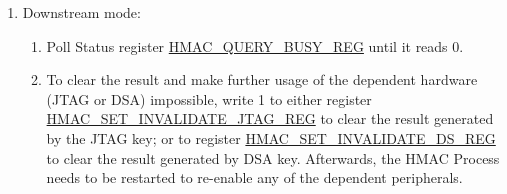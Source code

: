 \documentclass[main\_\_EN.tex]{subfiles}
\begin{document}
\begin{enumerate}
    \item Downstream mode:
    \begin{enumerate}
        \item Poll Status register \hyperref[regdesc:HMACQUERYBUSYREG]{HMAC\_QUERY\_BUSY\_REG} until it reads 0.
        \item
        To clear the result and make further usage of the dependent hardware (JTAG or DSA) impossible, write 1 to either register \hyperref[regdesc:HMACSETINVALIDATEJTAGREG]{HMAC\_SET\_INVALIDATE\_JTAG\_REG} to clear the result generated by the JTAG key; or to register \hyperref[regdesc:HMACSETINVALIDATEDSREG]{HMAC\_SET\_INVALIDATE\_DS\_REG} to clear the result generated by DSA key. Afterwards, the HMAC Process needs to be restarted to re-enable any of the dependent peripherals.
    \end{enumerate}


\end{enumerate}
\end{document}

